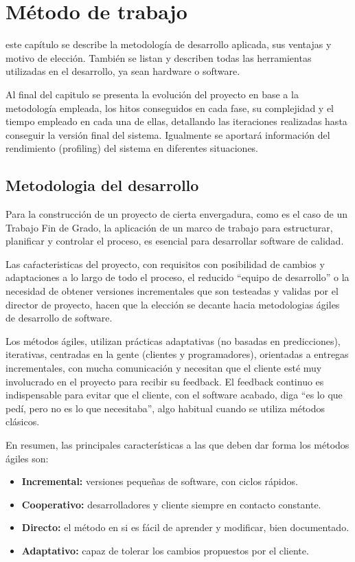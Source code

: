 \chapter{Método de trabajo}
\label{chap:metodo}

 este capítulo se describe la metodología de desarrollo aplicada, sus ventajas y motivo de elección. También se listan y describen todas las herramientas utilizadas en el desarrollo, ya sean hardware o software.

Al final del capitulo se presenta la evolución del proyecto en base a la metodología empleada, los hitos conseguidos en cada fase, su complejidad y el tiempo empleado en cada una de ellas, detallando las iteraciones realizadas hasta conseguir la versión final del sistema. Igualmente se aportará información del rendimiento (profiling) del sistema en diferentes situaciones.

\section{Metodologia del desarrollo}
Para la construcción de un proyecto de cierta envergadura, como es el caso de un Trabajo Fin de Grado, la aplicación de un marco de trabajo para estructurar, planificar y controlar el proceso, es esencial para desarrollar software de calidad.

Las caŕacteristicas del proyecto, con requisitos con posibilidad de cambios y adaptaciones a lo largo de todo el proceso, el reducido ``equipo de desarrollo'' o la necesidad de obtener versiones incrementales que son testeadas y validas por el director de proyecto, hacen que la elección se decante hacia metodologias ágiles de desarrollo de software.

Los métodos ágiles, utilizan prácticas adaptativas (no basadas en predicciones), iterativas, centradas en la gente (clientes y programadores), orientadas a entregas incrementales, con mucha comunicación y necesitan que el cliente esté muy involucrado en el proyecto para recibir su feedback. El feedback continuo es indispensable para evitar que el cliente, con el software acabado, diga “es lo que pedí, pero no es lo que necesitaba”, algo habitual cuando se utiliza métodos clásicos.

En resumen, las principales características a las que deben dar forma los métodos ágiles son:
\begin{itemize}
\item \textbf{Incremental:} versiones pequeñas de software, con ciclos rápidos. 
\item \textbf{Cooperativo:} desarrolladores y cliente siempre en contacto constante.
\item \textbf{Directo:} el método en si es fácil de aprender y modificar, bien documentado.
\item \textbf{Adaptativo:} capaz de tolerar los cambios propuestos por el cliente.
\end{itemize}

